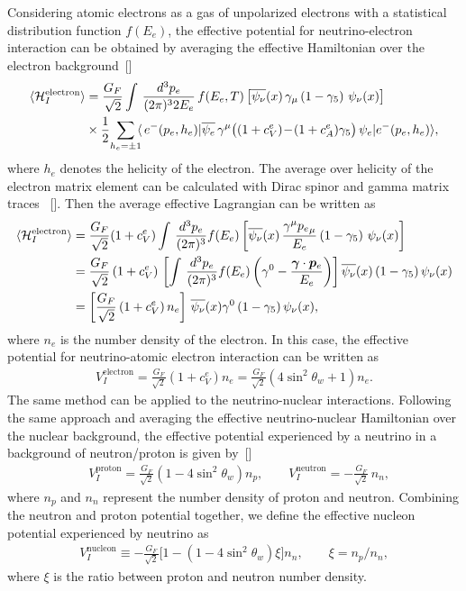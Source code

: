Considering atomic electrons as a gas of unpolarized electrons with a statistical distribution function $f(E_e)$, the effective potential for neutrino-electron interaction can be obtained by averaging the effective Hamiltonian over the electron background~[\cite{Giunti:2007ry}]
\begin{align}
\langle{\mathcal{H}^\mathrm{electron}_{I}}\rangle&=\frac{G_F}{\sqrt{2}}\int\,\frac{d^3p_e}{(2\pi)^32E_e}\,f(E_e,T)\left[\overline{\psi_\nu}(x)\,\gamma_\mu\left(1-\gamma_5\right)\,\psi_\nu(x)\right]\notag\\&\times\frac{1}{2}\!\sum_{h_e=\pm1}\!\!\langle\,e^-(p_e,h_e)|\overline{\psi_e}\,\gamma^\mu\big((1+c^e_V)\!-\!(1+c^e_A)\gamma_5\big)\,\psi_e|e^-(p_e,h_e)\rangle,
\end{align}
where $h_e$ denotes the helicity of the electron. The average over helicity of the electron matrix element can be calculated with Dirac spinor and gamma matrix traces ~[\cite{Giunti:2007ry}]. Then the average effective Lagrangian can be written as
\begin{align}
\langle{\mathcal{H}^\mathrm{electron}_{I}}\rangle&=\frac{G_F}{\sqrt{2}}(1+c^e_V)\int\,\frac{d^3p_e}{(2\pi)^3}f(E_e)\left[\overline{\psi_\nu}(x)\,\frac{\gamma^\mu{p_e}_\mu}{E_e}\left(1-\gamma_5\right)\,\psi_\nu(x)\right]\notag\\
&=\frac{G_F}{\sqrt{2}}\,(1+c^e_V)\,\left[\int\,\frac{d^3p_e}{(2\pi)^3}f(E_e)\left(\gamma^0-\frac{\vec{\gamma}\cdot\vec{{p}}_e}{E_e}\right)\right]\overline{\psi_\nu}(x)\left(1-\gamma_5\right)\psi_\nu(x)\notag\\
&=\left[\frac{G_F}{\sqrt{2}}\left(1+c^e_V\right)n_{e}\right]\,\overline{\psi_\nu}(x)\gamma^0\left(1-\gamma_5\right)\psi_\nu(x),
\end{align}
where $n_e$ is the number density of the electron. In this case, the effective potential for neutrino-atomic electron interaction can be written as
\begin{align}
V^{\mathrm{electron}}_{I}=\frac{G_F}{\sqrt{2}}\left(1+c^e_V\right)n_{e}=\frac{G_F}{\sqrt{2}}\left(4\sin^2\theta_w+1\right)n_{e}.
\end{align}
The same method can be applied to the neutrino-nuclear interactions. Following the same approach and averaging the effective neutrino-nuclear Hamiltonian over the nuclear background, the effective potential experienced by a neutrino in a background of neutron/proton is given by~[\cite{Giunti:2007ry}] 
\begin{align}
&V_{I}^{\mathrm{proton}}=\frac{G_F}{\sqrt{2}}\left(1-4\sin^2\theta_w\right)n_{p},\qquad V_{I}^{\mathrm{neutron}}=-\frac{G_F}{\sqrt{2}}\,n_{n},
\end{align}
where $n_p$ and $n_n$ represent the number density of proton and neutron.
Combining the neutron and proton potential together, we define the effective nucleon potential experienced by neutrino as 
\begin{align}
V_I^{\mathrm{nucleon}}\equiv-\frac{G_F}{\sqrt{2}}\bigg[1-\left(1-4\sin^2\theta_w\right)\xi\bigg]n_{n},\qquad\xi=n_{p}/n_{n},
\end{align}
where $\xi$ is the ratio between proton and neutron number density.

